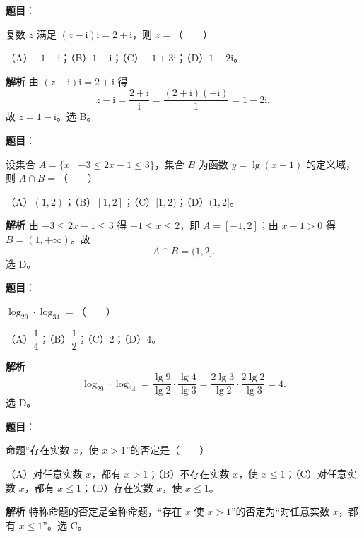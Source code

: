 
\begin{answer}

\textbf{题目}：

复数 $z$ 满足 $(z-\mathrm i)\mathrm i=2+\mathrm i$，则 $z=$\mbox{（　　）}

（A）$-1-\mathrm i$；（B）$1-\mathrm i$；（C）$-1+3\mathrm i$；（D）$1-2\mathrm i$。

\textbf{解析}
由 $(z-\mathrm i)\mathrm i=2+\mathrm i$ 得
\nopagebreak[4]
\[z-\mathrm i=\frac{2+\mathrm i}{\mathrm i}=\frac{(2+\mathrm i)(-\mathrm i)}{1}=1-2\mathrm i,\]
故 $z=1-\mathrm i$。选 B。


\end{answer}
\begin{answer}

\textbf{题目}：

设集合 $A=\{x\mid-3\leqslant2x-1\leqslant3\}$，集合 $B$ 为函数 $y=\lg(x-1)$ 的定义域，则 $A\cap B=$\mbox{（　　）}

（A）$(1,2)$；（B）$[1,2]$；（C）$[1,2)$；（D）$(1,2]$。

\textbf{解析}
由 $-3\leqslant2x-1\leqslant3$ 得 $-1\leqslant x\leqslant2$，即 $A=[-1,2]$；由 $x-1>0$ 得 $B=(1,+\infty)$。故
\nopagebreak[4]
\[A\cap B=(1,2].\]
选 D。


\end{answer}
\begin{answer}

\textbf{题目}：

$\log_29\cdot\log_34=$\mbox{（　　）}

（A）$\dfrac14$；（B）$\dfrac12$；（C）$2$；（D）$4$。

\textbf{解析}
\nopagebreak[4]
\[\log_29\cdot\log_34=\frac{\lg9}{\lg2}\cdot\frac{\lg4}{\lg3}=\frac{2\lg3}{\lg2}\cdot\frac{2\lg2}{\lg3}=4.\]
选 D。


\end{answer}
\begin{answer}

\textbf{题目}：

命题“存在实数 $x$，使 $x>1$”的否定是\mbox{（　　）}

（A）对任意实数 $x$，都有 $x>1$；（B）不存在实数 $x$，使 $x\leqslant1$；（C）对任意实数 $x$，都有 $x\leqslant1$；（D）存在实数 $x$，使 $x\leqslant1$。

\textbf{解析}
特称命题的否定是全称命题，“存在 $x$ 使 $x>1$”的否定为“对任意实数 $x$，都有 $x\leqslant1$”。选 C。


\end{answer}
